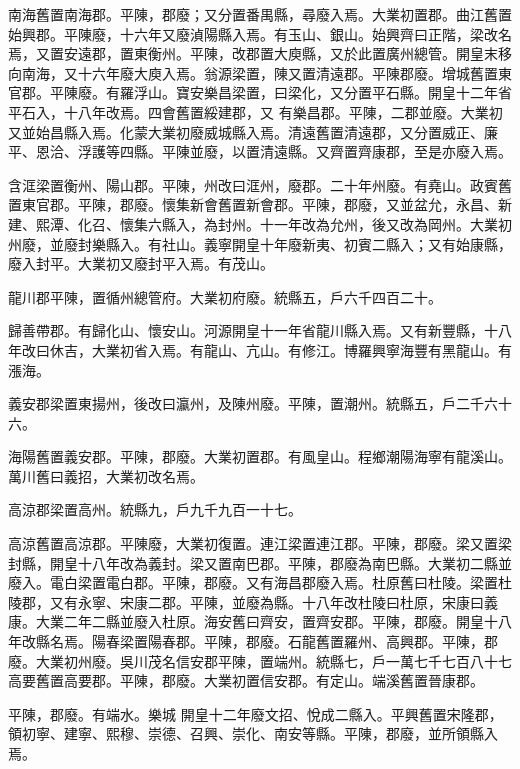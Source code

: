 \begin{pinyinscope}
 南海舊置南海郡。平陳，郡廢；又分置番禺縣，尋廢入焉。大業初置郡。曲江舊置始興郡。平陳廢，十六年又廢湞陽縣入焉。有玉山、銀山。始興齊曰正階，梁改名焉，又置安遠郡，置東衡州。平陳，改郡置大庾縣，又於此置廣州總管。開皇末移向南海，又十六年廢大庾入焉。翁源梁置，陳又置清遠郡。平陳郡廢。增城舊置東官郡。平陳廢。有羅浮山。寶安樂昌梁置，曰梁化，又分置平石縣。開皇十二年省平石入，十八年改焉。四會舊置綏建郡，又
 有樂昌郡。平陳，二郡並廢。大業初又並始昌縣入焉。化蒙大業初廢威城縣入焉。清遠舊置清遠郡，又分置威正、廉平、恩洽、浮護等四縣。平陳並廢，以置清遠縣。又齊置齊康郡，至是亦廢入焉。



 含洭梁置衡州、陽山郡。平陳，州改曰洭州，廢郡。二十年州廢。有堯山。政賓舊置東官郡。平陳，郡廢。懷集新會舊置新會郡。平陳，郡廢，又並盆允，永昌、新建、熙潭、化召、懷集六縣入，為封州。十一年改為允州，後又改為岡州。大業初州廢，並廢封樂縣入。有社山。義寧開皇十年廢新夷、初賓二縣入；又有始康縣，廢入封平。大業初又廢封平入焉。有茂山。



 龍川郡平陳，置循州總管府。大業初府廢。統縣五，戶六千四百二十。



 歸善帶郡。有歸化山、懷安山。河源開皇十一年省龍川縣入焉。又有新豐縣，十八年改曰休吉，大業初省入焉。有龍山、亢山。有修江。博羅興寧海豐有黑龍山。有漲海。



 義安郡梁置東揚州，後改曰瀛州，及陳州廢。平陳，置潮州。統縣五，戶二千六十
 六。



 海陽舊置義安郡。平陳，郡廢。大業初置郡。有風皇山。程鄉潮陽海寧有龍溪山。萬川舊曰義招，大業初改名焉。



 高涼郡梁置高州。統縣九，戶九千九百一十七。



 高涼舊置高涼郡。平陳廢，大業初復置。連江梁置連江郡。平陳，郡廢。梁又置梁封縣，開皇十八年改為義封。梁又置南巴郡。平陳，郡廢為南巴縣。大業初二縣並廢入。電白梁置電白郡。平陳，郡廢。又有海昌郡廢入焉。杜原舊曰杜陵。梁置杜陵郡，又有永寧、宋康二郡。平陳，並廢為縣。十八年改杜陵曰杜原，宋康曰義康。大業二年二縣並廢入杜原。海安舊曰齊安，置齊安郡。平陳，郡廢。開皇十八年改縣名焉。陽春梁置陽春郡。平陳，郡廢。石龍舊置羅州、高興郡。平陳，郡廢。大業初州廢。吳川茂名信安郡平陳，置端州。統縣七，戶一萬七千七百八十七高要舊置高要郡。平陳，郡廢。大業初置信安郡。有定山。端溪舊置晉康郡。



 平陳，郡廢。有端水。樂城
 開皇十二年廢文招、悅成二縣入。平興舊置宋隆郡，領初寧、建寧、熙穆、崇德、召興、崇化、南安等縣。平陳，郡廢，並所領縣入焉。




\end{pinyinscope}
